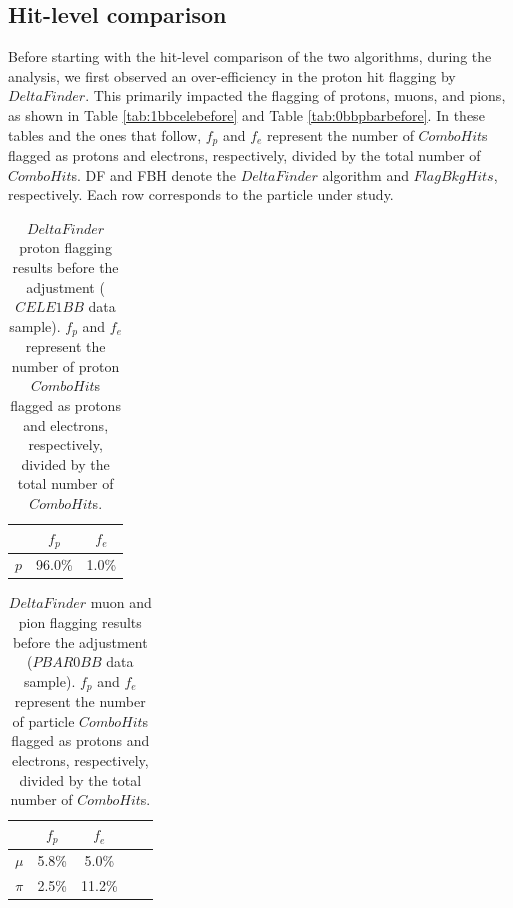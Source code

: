 \subsection{Hit-level comparison}
Before starting with the hit-level comparison of the two algorithms, during the analysis, 
we first observed an over-efficiency in the proton hit flagging by $DeltaFinder$. 
This primarily impacted the flagging of protons, muons, and pions, as shown in 
Table \ref{tab:1bbcelebefore} and Table \ref{tab:0bbpbarbefore}. In these tables 
and the ones that follow, $f_p$ and $f_e$ represent 
the number of $ComboHit$s flagged as protons and electrons, respectively, 
divided by the total number of $ComboHit$s. DF and FBH denote the $DeltaFinder$ 
algorithm and $FlagBkgHits$, respectively. Each row corresponds to the particle 
under study.
\begin{center}
    \begin{table}[h!]
    \centering
    \renewcommand{\arraystretch}{1.}
    \begin{tabular}{| c | c | c |} 
    \hline
    & $f_{p}$ & $f_{e}$ \\
    \hline
    $p$     & 96.0\% & 1.0\% \\
    \hline
    \end{tabular}
    \caption[$DeltaFinder$ proton flagging results before the adjustment.]{$DeltaFinder$ proton 
    flagging results before the adjustment ($CELE1BB$ data sample). $f_p$ and $f_e$ represent 
    the number of proton $ComboHit$s flagged as protons and electrons, respectively, 
    divided by the total number of $ComboHit$s.}
    \end{table}\label{tab:1bbcelebefore}
\end{center}
    
\begin{center}
    \begin{table}[h!]
        \centering
        \renewcommand{\arraystretch}{1.}
        \begin{tabular}{| c | c | c | c | c|} 
        \hline
        &   $f_{p}$ &   $f_{e}$\\
        \hline
        $\mu$ &  5.8\%  & 5.0\%\\
        \hline
        $\pi$ & 2.5\% &  11.2\%\\
        \hline
        \end{tabular}
        \caption[$DeltaFinder$ muon and pion flagging results before the adjustment.]{$DeltaFinder$ muon 
        and pion flagging results before the adjustment ($PBAR0BB$ data sample). $f_p$ and $f_e$ represent 
        the number of particle $ComboHit$s flagged as protons and electrons, respectively, 
        divided by the total number of $ComboHit$s.}
    \end{table}\label{tab:0bbpbarbefore}
\end{center}

